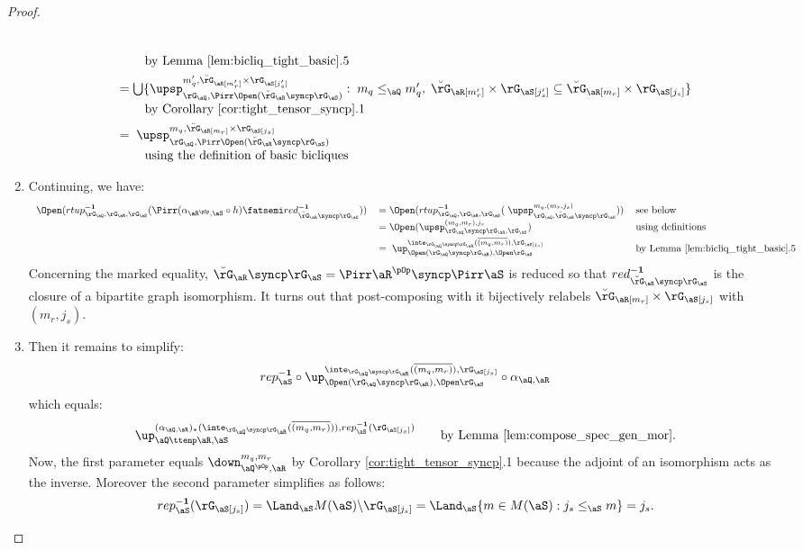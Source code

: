 \documentclass{article}
\begin{document}
\begin{proof}
\begin{enumerate}
\[\begin{tabular}{lll}
\\[1ex] \qquad
by Lemma \ref{lem:bicliq_tight_basic}.5
\\[1ex]
$= \bigcup \{ \upsp_{\rG_\aQ,\Pirr\Open(\breve{\rG}_\aR \syncp \rG_\aS) }^{m'_q , \breve{\rG}_\aR[m'_r] \times \rG_\aS[j'_s] } : \; m_q \leq_\aQ m'_q, \; \breve{\rG}_\aR[m'_r] \times \rG_\aS[j'_s] \subseteq \breve{\rG}_\aR[m_r] \times \rG_\aS[j_s]  \}$
\\[1ex] \qquad
by Corollary \ref{cor:tight_tensor_syncp}.1
\\[1ex]
$= \; \upsp_{\rG_\aQ,\Pirr\Open(\breve{\rG}_\aR \syncp \rG_\aS) }^{m_q , \breve{\rG}_\aR[m_r] \times \rG_\aS[j_s] }$
\\[1ex]\qquad
using the definition of basic bicliques
\end{tabular}
\]

\item
Continuing, we have:
\[
\begin{tabular}{lll}
$\Open(rtup_{\rG_\aQ,\rG_\aR,\rG_\aS}^{\bf-1}(\Pirr (\alpha_{\aR^{\pOp},\aS} \circ h)  \fatsemi red_{\breve{\rG}_\aR \syncp \rG_\aS}^{\bf-1} ))$
&
$= \Open(rtup_{\rG_\aQ,\rG_\aR,\rG_\aS}^{\bf-1}( \; \upsp_{\rG_\aQ,\breve{\rG}_\aR \syncp \rG_\aS }^{m_q , (m_r,j_s) } ))$
& see below
\\&
$= \Open(\upsp_{\rG_\aQ \syncp \rG_\aR , \rG_\aS }^{(m_q,m_r),j_s} )$
& using definitions
\\[1ex]&
$= \; \up_{\Open(\rG_\aQ \syncp \rG_\aR ),\Open\rG_\aS }^{ \inte_{\rG_\aQ \syncp \rG_\aR}(\overline{(m_q,m_r)}), \rG_\aS[j_s] }$
& by Lemma \ref{lem:bicliq_tight_basic}.5
\end{tabular}
\]
Concerning the marked equality, $\breve{\rG}_\aR \syncp \rG_\aS = \Pirr\aR^{\pOp} \syncp \Pirr\aS$ is reduced so that $red_{\breve{\rG}_\aR \syncp \rG_\aS}^{\bf-1}$ is the closure of a bipartite graph isomorphism. It turns out that post-composing with it bijectively relabels $\breve{\rG}_\aR[m_r] \times \rG_\aS[j_s]$ with $(m_r,j_s)$.

\item
Then it remains to simplify:
\[
rep_\aS^{\bf-1} \circ
\up_{\Open(\rG_\aQ \syncp \rG_\aR ),\Open\rG_\aS }^{ \inte_{\rG_\aQ \syncp \rG_\aR}(\overline{(m_q,m_r)}), \rG_\aS[j_s] }
\circ  \alpha_{\aQ,\aR}
\]
which equals:
\[
\up_{ \aQ \ttenp \aR , \aS }^{ (\alpha_{\aQ,\aR})_*(\inte_{\rG_\aQ \syncp \rG_\aR}(\overline{(m_q,m_r)})) , rep_\aS^{\bf-1}(\rG_\aS[j_s]) }
\qquad
\text{by Lemma \ref{lem:compose_spec_gen_mor}.}
\]
Now, the first parameter equals $\down_{\aQ^{\pOp},\aR}^{m_q,m_r}$ by Corollary \ref{cor:tight_tensor_syncp}.1 because the adjoint of an isomorphism acts as the inverse. Moreover the second parameter simplifies as follows:
\[
rep_\aS^{\bf-1}(\rG_\aS[j_s])
= \Land_\aS M(\aS) \backslash \rG_\aS[j_s]
= \Land_\aS \{ m \in M(\aS) : j_s \leq_\aS m \}
= j_s.
\]
\end{enumerate}


\end{proof}
\end{document}
